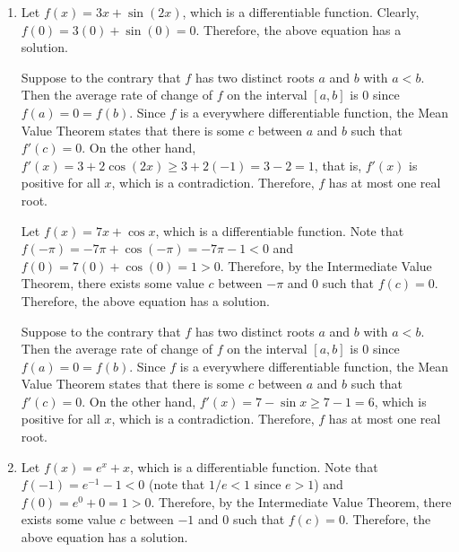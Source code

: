 \documentclass{book}
\begin{document}
\begin{appendices}
\begin{enumerate}[!HW!]
\begin{pf}
Suppose to the contrary that $f$ has two distinct roots $a$ and $b$ with $a< b$. Then the average rate of change of $f$ on the interval $[a,b]$ is 0 since $f(a) = 0 = f(b)$. Since $f$ is a everywhere differentiable function, the Mean Value Theorem states that there is some $c$ between $a$ and $b$ such that $f'(c) = 0$. On the other hand, $f'(x) = 2+\cos x > 2-1 = 1$, which is positive for all $x$, which is a contradiction. Therefore, $f$ has at most one real root.
\end{pf}

\item \begin{pf}
Let $f(x)=3x+\sin(2x)$, which is a differentiable function. Clearly, $f(0) = 3(0)+\sin(0) = 0$. Therefore, the above equation has a solution.

Suppose to the contrary that $f$ has two distinct roots $a$ and $b$ with $a< b$. Then the average rate of change of $f$ on the interval $[a,b]$ is 0 since $f(a) = 0 = f(b)$. Since $f$ is a everywhere differentiable function, the Mean Value Theorem states that there is some $c$ between $a$ and $b$ such that $f'(c) = 0$. On the other hand, $f'(x) = 3+2\cos(2x) \ge 3+2(-1) = 3-2 = 1$, that is, $f'(x)$ is positive for all $x$, which is a contradiction. Therefore, $f$ has at most one real root.
\end{pf}
\itemspade \begin{pf}
Let $f(x)=7x+\cos x$, which is a differentiable function. Note that $f(-\pi) = -7\pi + \cos(-\pi) = -7\pi-1 < 0$ and $f(0) = 7(0) + \cos(0) = 1 > 0$. Therefore, by the Intermediate Value Theorem, there exists some value $c$ between $-\pi$ and $0$ such that $f(c) = 0$. Therefore, the above equation has a solution.

Suppose to the contrary that $f$ has two distinct roots $a$ and $b$ with $a< b$. Then the average rate of change of $f$ on the interval $[a,b]$ is 0 since $f(a) = 0 = f(b)$. Since $f$ is a everywhere differentiable function, the Mean Value Theorem states that there is some $c$ between $a$ and $b$ such that $f'(c) = 0$. On the other hand, $f'(x) = 7-\sin x \ge 7 - 1 = 6$, which is positive for all $x$, which is a contradiction. Therefore, $f$ has at most one real root.
\end{pf}

\item \begin{pf}
Let $f(x)=e^x+x$, which is a differentiable function. Note that $f(-1) = e^{-1}-1 < 0$ (note that  $1/e<1$ since $e>1$) and $f(0) = e^0+0 = 1 > 0$. Therefore, by the Intermediate Value Theorem, there exists some value $c$ between $-1$ and $0$ such that $f(c) = 0$. Therefore, the above equation has a solution.


\end{pf}
\end{enumerate}
\end{appendices}
\end{document}
